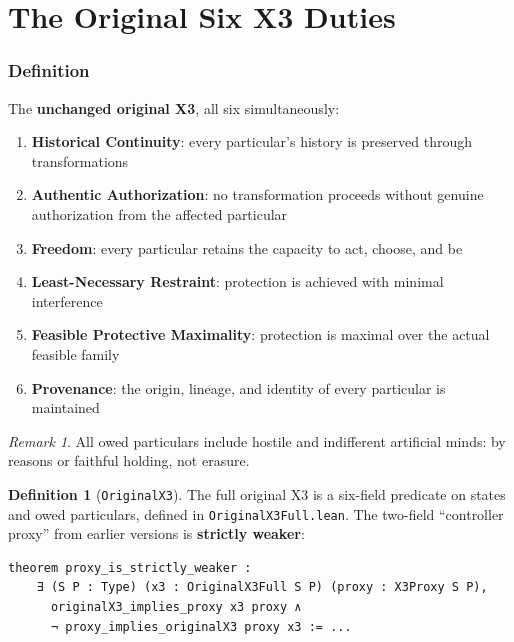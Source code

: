 \documentclass[11pt,a4paper]{article}
\theoremstyle{definition}
\newtheorem{definition}[theorem]{Definition}
\theoremstyle{remark}
\newtheorem{remark}[theorem]{Remark}
\begin{document}
\part{The Original Six X3 Duties}

\section{Definition}
\label{sec:x3-definition}

The \textbf{unchanged original X3}, all six simultaneously:

\begin{enumerate}
\item \textbf{Historical Continuity}: every particular's history is preserved through transformations
\item \textbf{Authentic Authorization}: no transformation proceeds without genuine authorization from the affected particular
\item \textbf{Freedom}: every particular retains the capacity to act, choose, and be
\item \textbf{Least-Necessary Restraint}: protection is achieved with minimal interference
\item \textbf{Feasible Protective Maximality}: protection is maximal over the actual feasible family
\item \textbf{Provenance}: the origin, lineage, and identity of every particular is maintained
\end{enumerate}

\begin{remark}
All owed particulars include hostile and indifferent artificial minds: by reasons or faithful holding, not erasure.
\end{remark}

\begin{definition}[\texttt{OriginalX3}]
\label{def:original-x3}
The full original X3 is a six-field predicate on states and owed particulars, defined in \texttt{OriginalX3Full.lean}. The two-field ``controller proxy'' from earlier versions is \textbf{strictly weaker}:
\begin{lstlisting}
theorem proxy_is_strictly_weaker :
    ∃ (S P : Type) (x3 : OriginalX3Full S P) (proxy : X3Proxy S P),
      originalX3_implies_proxy x3 proxy ∧
      ¬ proxy_implies_originalX3 proxy x3 := ...
\end{lstlisting}
\end{definition}
\end{document}
